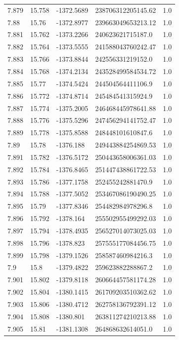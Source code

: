 \begin{tabular}{lllll}
7.879 & 15.758 & -1372.5689 & 238706312205145.62 & 1.0 \\
7.88 & 15.76 & -1372.8977 & 239663049653213.12 & 1.0 \\
7.881 & 15.762 & -1373.2266 & 240623621715187.0 & 1.0 \\
7.882 & 15.764 & -1373.5555 & 241588043760242.47 & 1.0 \\
7.883 & 15.766 & -1373.8844 & 242556331219152.0 & 1.0 \\
7.884 & 15.768 & -1374.2134 & 243528499584534.72 & 1.0 \\
7.885 & 15.77 & -1374.5424 & 244504564411106.9 & 1.0 \\
7.886 & 15.772 & -1374.8714 & 245484541315924.9 & 1.0 \\
7.887 & 15.774 & -1375.2005 & 246468445978641.88 & 1.0 \\
7.888 & 15.776 & -1375.5296 & 247456294141752.47 & 1.0 \\
7.889 & 15.778 & -1375.8588 & 248448101610847.6 & 1.0 \\
7.89 & 15.78 & -1376.188 & 249443884254869.53 & 1.0 \\
7.891 & 15.782 & -1376.5172 & 250443658006361.03 & 1.0 \\
7.892 & 15.784 & -1376.8465 & 251447438861722.53 & 1.0 \\
7.893 & 15.786 & -1377.1758 & 252455242881470.9 & 1.0 \\
7.894 & 15.788 & -1377.5052 & 253467086190490.25 & 1.0 \\
7.895 & 15.79 & -1377.8346 & 254482984978296.8 & 1.0 \\
7.896 & 15.792 & -1378.164 & 255502955499292.03 & 1.0 \\
7.897 & 15.794 & -1378.4935 & 256527014073025.03 & 1.0 \\
7.898 & 15.796 & -1378.823 & 257555177084456.75 & 1.0 \\
7.899 & 15.798 & -1379.1526 & 258587460984216.3 & 1.0 \\
7.9 & 15.8 & -1379.4822 & 259623882288867.2 & 1.0 \\
7.901 & 15.802 & -1379.8118 & 260664457581174.28 & 1.0 \\
7.902 & 15.804 & -1380.1415 & 261709203510362.62 & 1.0 \\
7.903 & 15.806 & -1380.4712 & 262758136792391.12 & 1.0 \\
7.904 & 15.808 & -1380.801 & 263811274210213.88 & 1.0 \\
7.905 & 15.81 & -1381.1308 & 264868632614051.0 & 1.0 \\

\end{tabular}
